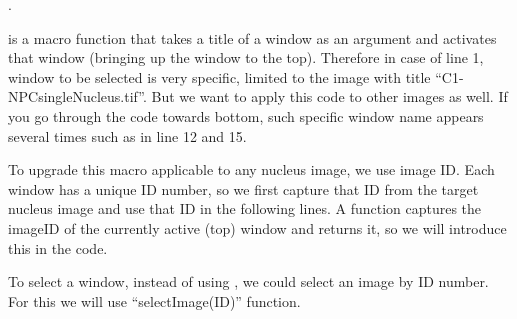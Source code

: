 . 

\begin{indentCom}
\end{indentCom}

 is a macro function that takes a title of a window as an argument and activates that window (bringing up the window to the top). Therefore in case of line 1, window to be selected is very specific, limited to the image with title ``C1-NPCsingleNucleus.tif''. But we want to apply this code to other images as well. If you go through the code towards bottom, such specific window name appears several times such as in line 12 and 15.

To upgrade this macro applicable to any nucleus image, we use image ID. Each window has a unique ID number, so we first capture that ID from the target nucleus image and use that ID in the following lines. A function  captures the imageID of the currently active (top) window and returns it, so we will introduce this in the code. 

\begin{indentCom}
\end{indentCom}

To select a window, instead of using , we could select an image by ID number. For this we will use ``selectImage(ID)'' function.

\begin{indentCom}

\end{indentCom}

